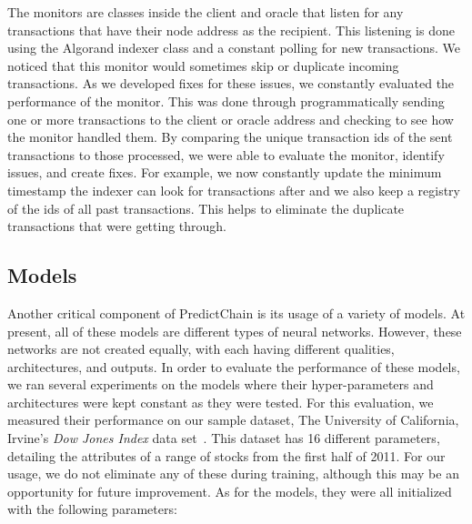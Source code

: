 \documentclass{ledger}
\begin{document}
The monitors are classes inside the client and oracle that listen for any transactions that have their node address
as the recipient.  This listening is done using the Algorand indexer class and a constant polling for new transactions.
We noticed that this monitor would sometimes skip or duplicate incoming transactions.  As we developed fixes for
these issues, we constantly evaluated the performance of the monitor.  This was done through programmatically sending
one or more transactions to the client or oracle address and checking to see how the monitor handled them.  By comparing
the unique transaction ids of the sent transactions to those processed, we were able to evaluate the monitor,
identify issues, and create fixes. For example, we now constantly update the minimum timestamp the indexer can look
for transactions after and we also keep a registry of the ids of all past transactions.  This helps to eliminate
the duplicate transactions that were getting through.

\subsection{Models}

Another critical component of PredictChain is its usage of a variety of models.  At present, all of these models
are different types of neural networks.  However, these networks are not created equally, with each having different
qualities, architectures, and outputs.  In order to evaluate the performance of these models, we ran several experiments
on the models where their hyper-parameters and architectures were kept constant as they were tested.  For this
evaluation, we measured their performance on our sample dataset, The University of California, Irvine's \textit{Dow Jones
Index} data set~\cite{dowJones}.  This dataset has 16 different parameters, detailing the attributes of a range of
stocks from the first half of 2011.  For our usage, we do not eliminate any of these during training, although this
may be an opportunity for future improvement.  As for the models, they were all initialized with the following parameters:
\end{document}
